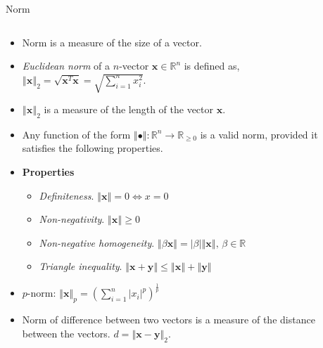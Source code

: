 \documentclass[aspectratio=169]{beamer}
\let\olditem\item
\renewcommand{\item}{\setlength{\itemsep}{\fill}\olditem}
\begin{document}
\begin{frame}[t]{Norm}
\begin{columns}[T]
\begin{column}{0.65\textwidth}
\vspace{-0.5cm}
\begin{small}
\begin{itemize}
  \item Norm is a measure of the size of a vector.
  \item \textit{Euclidean norm} of a $n$-vector $\mathbf{x} \in \mathbb{R}^n$ is defined as, $\left\Vert \mathbf{x}\right\Vert_2 = \sqrt{\mathbf{x}^T\mathbf{x}} = \sqrt{\sum_{i=1}^{n}x_i^2}$.
  \item $\left\Vert \mathbf{x} \right\Vert_2$ is a measure of the length of the vector $\mathbf{x}$.
  \item Any function of the form $\left\Vert\bullet\right\Vert: \mathbb{R}^n \longrightarrow \mathbb{R}_{\geq 0}$ is a valid norm, provided it satisfies the following properties.
  \item \textbf{Properties}
  \begin{itemize}
  \item \textit{Definiteness}. $\left\Vert \mathbf{x}\right\Vert = 0 \iff x = 0$
  \item \textit{Non-negativity}. $\left\Vert \mathbf{x} \right\Vert \geq 0$
  \item \textit{Non-negative homogeneity}. $\left\Vert \beta \mathbf{x} \right\Vert = \left|\beta\right|\left\Vert \mathbf{x} \right\Vert, \, \beta \in \mathbb{R}$
  \item \textit{Triangle inequality}. $\left\Vert \mathbf{x} + \mathbf{y}\right\Vert \leq \left\Vert \mathbf{x}\right\Vert + \left\Vert \mathbf{y}\right\Vert$
  \end{itemize}
  \item $p$-norm: $\left\Vert \mathbf{x} \right\Vert_p = \left(\sum_{i=1}^{n}\left|x_i\right|^p\right)^{\frac{1}{p}}$
  \item Norm of difference between two vectors is a measure of the distance between the vectors. $d = \left\Vert \mathbf{x} - \mathbf{y} \right\Vert_2$.
\end{itemize}
\end{small}
\end{column}
\begin{column}{0.35\textwidth}
\end{column}
\end{columns}
\end{frame}
\end{document}
